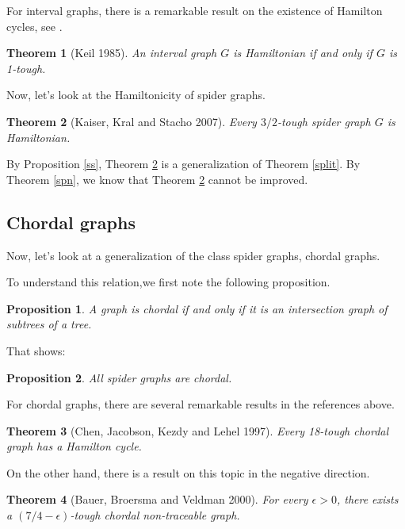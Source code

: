 \documentclass[12pt]{report}
\newtheorem{theorem}{Theorem}
\newtheorem{proposition}{Proposition}
\begin{document}
For interval graphs, there is a remarkable result on the existence of Hamilton cycles, see \cite{keil1985finding}.

\begin{theorem}[Keil 1985]
An interval graph $G$ is Hamiltonian if and only if $G$ is 1-tough.
\end{theorem}

Now, let's look at the Hamiltonicity of spider graphs.
\begin{theorem}[Kaiser, Kral and Stacho 2007]\label{spider}
Every $3/2$-tough spider graph $G$ is Hamiltonian.
\end{theorem}
By Proposition \ref{ss}, Theorem \ref{spider} is a generalization of Theorem \ref{split}. By Theorem \ref{spn}, we know that Theorem \ref{spider} cannot be improved.














\subsection{Chordal graphs}\label{secchoginht}



Now, let's look at a generalization of the class spider graphs, chordal graphs.

To understand this relation,we first note the following proposition.
\begin{proposition}
A graph is chordal if and only if it is an intersection graph of subtrees of a tree.
\end{proposition}

That shows:
\begin{proposition}
All spider graphs are chordal.
\end{proposition}



For chordal graphs, there are several remarkable results in the references above.

\begin{theorem}[Chen, Jacobson, Kezdy and Lehel 1997]\label{chord18}
Every 18-tough chordal graph has a Hamilton cycle.
\end{theorem}



On the other hand, there is a result on this topic in the negative direction.
\begin{theorem}[Bauer, Broersma and Veldman 2000]\label{count74ep}
For every $\epsilon>0$, there exists a $(7/4-\epsilon)$-tough chordal non-traceable graph.
\end{theorem}
\end{document}

